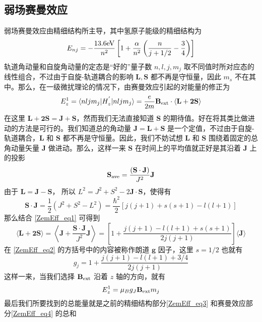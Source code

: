 \subsection{弱场赛曼效应}
弱场赛曼效应由精细结构所主导，其中氢原子能级的精细结构为
\begin{equation}\label{ZemEff_eq3}
E_{nj}=-\frac{13.6\rm{eV}}{n^2}\left[1+\frac{\alpha}{n^2}\left(\frac{n}{j+1/2}-\frac{3}{4}\right)\right]
\end{equation}
轨道角动量和自旋角动量的定态是“好的”量子数 $n,l,j,m_j$ 取不同值时所对应态的线性组合，不过由于自旋-轨道耦合的影响 $\mathbf{L,S}$ 都不再是守恒量，因此 $m_s$ 不在其中。那么，在一级微扰理论的情况下，由赛曼效应引起的对能量的修正为
$$
E_z^{1}=\langle nljm_j|H_z^{'}|nljm_j\rangle=\frac{e}{2m}\mathbf{B}_{\rm{ext}}\cdot\langle\mathbf{L+2S}\rangle
$$
在这里 $\mathbf{L+2S=J+S}$，然而我们无法直接知道 $\mathbf{S}$ 的期待值。好在将其类比做进动的方法是可行的。我们知道总的角动量 $\mathbf{J=L+S}$ 是一个定值，不过由于自旋-轨道耦合，$\mathbf{L}$ 和 $\mathbf{S}$ 都不再是守恒量。因此，我们不妨试想 $\mathbf{L}$ 和 $\mathbf{S}$ 围绕着固定的总角动量矢量 $\mathbf{J}$ 做进动。那么，这样一来 $\mathbf{S}$ 在时间上的平均值就正好是其沿着 $\mathbf{J}$ 上的投影
\begin{equation}\label{ZemEff_eq1}
\mathbf{S}_{\rm{ave}}=\frac{(\mathbf{S\cdot J})}{J^2}\mathbf{J}
\end{equation}
由于 $\mathbf{L=J-S}$， 所以 $L^2=J^2+S^2-2\mathbf{J\cdot S}$，使得有
\begin{equation}
\mathbf{S\cdot J}=\frac{1}{2}(J^2+S^2-L^2)=\frac{\hbar^2}{2}[j(j+1)+s(s+1)-l(l+1)]
\end{equation}
那么结合 \autoref{ZemEff_eq1} 可得到
\begin{equation}\label{ZemEff_eq2}
\langle \mathbf{L+2S}\rangle =\left\langle \mathbf{J}+\frac{\mathbf{S\cdot J}}{J^2}\mathbf{J}\right\rangle=\left[1+\frac{j(j+1)-l(l+1)+s(s+1)}{2j(j+1)}\right]\langle\mathbf{J}\rangle
\end{equation}
在 \autoref{ZemEff_eq2} 的方括号中的内容被称作朗道 $\mathbf{g}$ 因子，这里 $s=1/2$ 也就有
\begin{equation}\label{ZemEff_eq15}
g_j=1+\frac{j(j+1)-l(l+1)+3/4}{2j(j+1)}
\end{equation}
这样一来，当我们选择 $\mathbf{B}_{\rm{ext}}$ 沿着 $z$ 轴的方向，就有
\begin{equation}\label{ZemEff_eq4}
E^1_z =\mu_Bg_J\mathbf{B}_{\rm{ext}}m_j
\end{equation}
最后我们所要找到的总能量就是之前的精细结构部分\autoref{ZemEff_eq3} 和赛曼效应部分\autoref{ZemEff_eq4} 的总和
